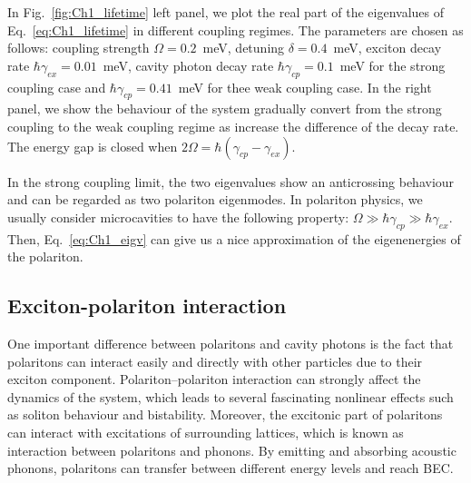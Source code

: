 In Fig.~\ref{fig:Ch1_lifetime} left panel, we plot the real part of the eigenvalues of Eq.~\eqref{eq:Ch1_lifetime} in different coupling regimes.
The parameters are chosen as follows: coupling strength $\Omega=0.2$~meV, detuning $\delta=0.4$~meV, exciton decay rate $\hbar\gamma_{ex} = 0.01$~meV, cavity photon decay rate $\hbar\gamma_{cp} = 0.1$~meV for the strong coupling case and $\hbar\gamma_{cp} = 0.41$~meV for thee weak coupling case.
In the right panel, we show the behaviour of the system gradually convert from the strong coupling to the weak coupling regime as increase the difference of the decay rate.
The energy gap is closed when $2\Omega=\hbar\left(\gamma_{cp}-\gamma_{ex}\right)$.

In the strong coupling limit, the two eigenvalues show an anticrossing behaviour and can be regarded as two polariton eigenmodes.
In polariton physics, we usually consider microcavities to have the following property: $\Omega \gg \hbar\gamma_{cp} \gg \hbar\gamma_{ex}$.
Then, Eq.~\eqref{eq:Ch1_eigv} can give us a nice approximation of the eigenenergies of the polariton.

\subsection{Exciton-polariton interaction}
One important difference between polaritons and cavity photons is the fact that polaritons can interact easily and directly with other particles due to their exciton component.
Polariton--polariton interaction can strongly affect the dynamics of the system, which leads to several fascinating nonlinear effects such as soliton behaviour and bistability.
Moreover, the excitonic part of polaritons can interact with excitations of surrounding lattices, which is known as interaction between polaritons and phonons.
By emitting and absorbing acoustic phonons, polaritons can transfer between different energy levels and reach BEC.

